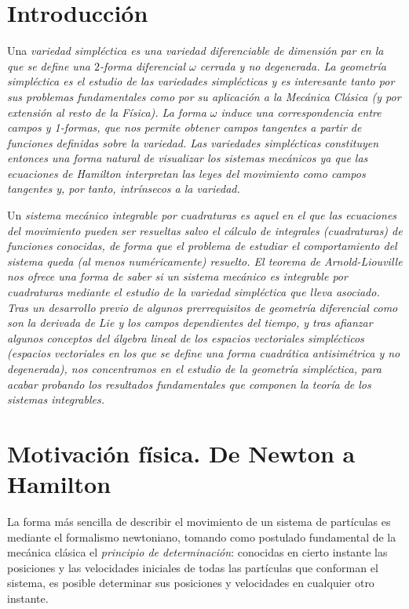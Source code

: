 \chapter*{Introducción}
Una \em variedad simpléctica \em es una variedad diferenciable de dimensión par en la que se define una $2$-forma diferencial $\omega$ cerrada y no degenerada. La \em geometría simpléctica \em es el estudio de las variedades simplécticas y es interesante tanto por sus problemas fundamentales como por su aplicación a la Mecánica Clásica (y por extensión al resto de la Física). La forma $\omega$ induce una correspondencia entre campos y 1-formas, que nos permite obtener campos tangentes a partir de funciones definidas sobre la variedad. Las variedades simplécticas constituyen entonces una forma natural de visualizar los sistemas mecánicos ya que las \em ecuaciones de Hamilton \em interpretan las leyes del movimiento como campos tangentes y, por tanto, intrínsecos a la variedad. 

Un \em sistema mecánico integrable por cuadraturas \em  es aquel en el que las ecuaciones del movimiento pueden ser resueltas salvo el cálculo de integrales (cuadraturas) de funciones conocidas, de forma que el problema de estudiar el comportamiento del sistema queda (al menos numéricamente) resuelto. El \em teorema de Arnold-Liouville \em nos ofrece una forma de saber si un sistema mecánico es integrable por cuadraturas mediante el estudio de la variedad simpléctica que lleva asociado.
Tras un desarrollo previo de algunos prerrequisitos de geometría diferencial como son la \em derivada de Lie \em y los \em campos dependientes del tiempo\em, y tras afianzar algunos conceptos del álgebra lineal de los \em espacios vectoriales simplécticos \em (espacios vectoriales en los que se define una forma cuadrática antisimétrica y no degenerada), nos concentramos en el estudio de la geometría simpléctica, para acabar probando los resultados fundamentales que componen la teoría de los sistemas integrables.

\newpage\null\thispagestyle{empty}\newpage

\chapter{Motivación física. De Newton a Hamilton} \label{sec:fisica}
La forma más sencilla de describir el movimiento de un sistema de partículas es mediante el formalismo newtoniano, tomando como postulado fundamental de la mecánica clásica el \emph{principio de determinación}: conocidas en cierto instante las posiciones y las velocidades iniciales de todas las partículas que conforman el sistema, es posible determinar sus posiciones y velocidades en cualquier otro instante.

